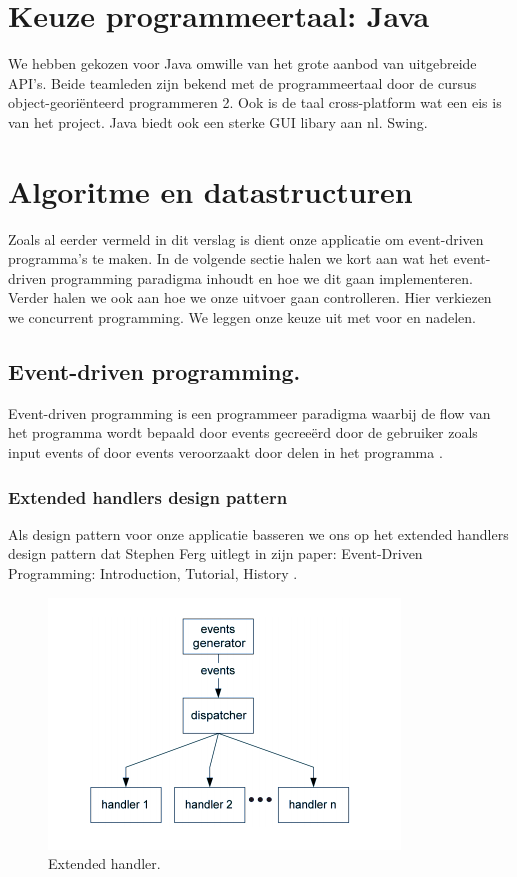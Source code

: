 \documentclass[]{article}
\begin{document}
\section{Keuze programmeertaal: Java}
We hebben gekozen voor Java omwille van het grote aanbod van uitgebreide API's. Beide teamleden zijn bekend met de programmeertaal door de cursus object-geori\"{e}nteerd programmeren 2. Ook is de taal cross-platform wat een eis is van het project. Java biedt ook een sterke GUI libary aan nl. Swing.
\section{Algoritme en datastructuren}
\label{Algoritme}
Zoals al eerder vermeld in dit verslag is dient onze applicatie om event-driven programma's te maken. In de volgende sectie halen we kort aan wat het event-driven programming paradigma inhoudt en hoe we dit gaan implementeren. Verder halen we ook aan hoe we onze uitvoer gaan controlleren. Hier verkiezen we concurrent programming. We leggen onze keuze uit met voor en nadelen.
\subsection{Event-driven programming.}
Event-driven programming is een programmeer paradigma waarbij de flow van het programma wordt bepaald door events gecree\"{e}rd door de gebruiker zoals input events of door events veroorzaakt door delen in het programma \cite{eventdrivenwiki}.

\subsubsection{Extended handlers design pattern}
Als design pattern voor onze applicatie basseren we ons op het extended handlers design pattern dat Stephen Ferg uitlegt in zijn paper: Event-Driven Programming: Introduction, Tutorial, History \cite{eventdrivenStephen}.
\begin{figure}[H]
  \centering
\includegraphics[scale=0.5]{AnalyseADTAlgorithm/extendedHandlerspattern.png}
  \caption{Extended handler.} \label{extendedHandler}
\end{figure}
\end{document}
